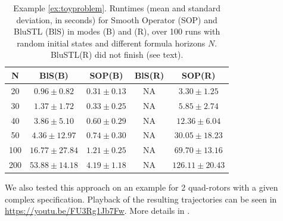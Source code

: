 \begin{table}[tb]
\small
\begin{center}
\caption{{\small Example \ref{ex:toyproblem}. Runtimes (mean and standard deviation, in seconds) for Smooth Operator (SOP) and BluSTL (BlS) in modes (B) and (R), over 100 runs with random initial states and different formula horizons $N$. BluSTL(R) did not finish (see text).}}
\vspace{-5pt}
\label{tbl:time_performance_toy}
\begin{tabular} {|c|c|c|c|c|}
	\hline
	N & BlS(B) & SOP(B) & BlS(R) & SOP(R) \\ \hline
	20 & $0.96 \pm 0.82$ &  $\mathbf{0.31 \pm 0.13}$  & NA & $3.30 \pm 1.25$ \\ \hline
	30 & $1.37 \pm 1.72$ &  $\mathbf{0.33 \pm 0.25}$  & NA & $5.85 \pm 2.74$\\ \hline
	40 & $3.86 \pm 5.10$ &  $\mathbf{0.60 \pm 0.29}$  & NA & $12.36 \pm 6.04$\\ \hline
	50 & $4.36 \pm 12.97$&  $\mathbf{0.74 \pm 0.30}$ & NA & $30.05 \pm 18.23$\\ \hline
	100& $16.77 \pm 27.84$ & $\mathbf{1.21 \pm 0.25}$ & NA & $69.70 \pm 13.16$ \\ \hline
	200& $53.88 \pm 14.18$& $\mathbf{4.19 \pm 1.18}$ & NA & $126.11 \pm 20.43$ \\ \hline
\end{tabular}	
\end{center}
\end{table}

\begin{exmp}
We also tested this approach on an example for 2 quad-rotors with a given complex specification. Playback of the resulting trajectories can be seen in \protect\url{https://youtu.be/FU3Rg1Jb7Fw}. More details in \cite{PantAM17_SmoothOpTechRpt}.
\end{exmp}